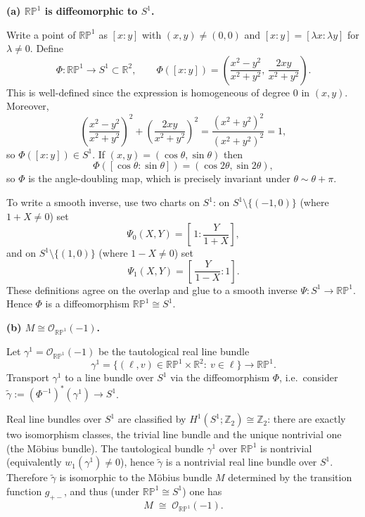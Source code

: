 \begin{solution}

\par\medskip\noindent\textbf{(a) $\mathbb{RP}^1$ is diffeomorphic to $S^1$.}\par\smallskip

Write a point of $\mathbb{RP}^1$ as $[x:y]$ with $(x,y)\neq (0,0)$ and $[x:y]=[\lambda x:\lambda y]$
for $\lambda\neq 0$.
Define
\[
\Phi:\mathbb{RP}^1 \longrightarrow S^1\subset\mathbb{R}^2,\qquad
\Phi([x:y])=\left(\frac{x^2-y^2}{x^2+y^2},\,\frac{2xy}{x^2+y^2}\right).
\]
This is well-defined since the expression is homogeneous of degree $0$ in $(x,y)$.
Moreover,
\[
\left(\frac{x^2-y^2}{x^2+y^2}\right)^2+\left(\frac{2xy}{x^2+y^2}\right)^2
=\frac{(x^2+y^2)^2}{(x^2+y^2)^2}=1,
\]
so $\Phi([x:y])\in S^1$. If $(x,y)=(\cos\theta,\sin\theta)$ then
\[
\Phi([\cos\theta:\sin\theta])=(\cos 2\theta,\sin 2\theta),
\]
so $\Phi$ is the angle-doubling map, which is precisely invariant under $\theta\sim\theta+\pi$.

To write a smooth inverse, use two charts on $S^1$:
on $S^1\setminus\{(-1,0)\}$ (where $1+X\neq 0$) set
\[
\Psi_0(X,Y)=\left[\,1:\frac{Y}{1+X}\right],
\]
and on $S^1\setminus\{(1,0)\}$ (where $1-X\neq 0$) set
\[
\Psi_1(X,Y)=\left[\,\frac{Y}{1-X}:1\right].
\]
These definitions agree on the overlap and glue to a smooth inverse $\Psi:S^1\to \mathbb{RP}^1$.
Hence $\Phi$ is a diffeomorphism $\mathbb{RP}^1\cong S^1$.

\par\medskip\noindent\textbf{(b) $M \cong \mathcal{O}_{\mathbb{RP}^1}(-1)$.}\par\smallskip

Let $\gamma^1=\mathcal{O}_{\mathbb{RP}^1}(-1)$ be the tautological real line bundle
\[
\gamma^1=\{(\ell,v)\in\mathbb{RP}^1\times\mathbb{R}^2:\ v\in \ell\}\longrightarrow \mathbb{RP}^1.
\]
Transport $\gamma^1$ to a line bundle over $S^1$ via the diffeomorphism $\Phi$, i.e.\ consider
$\widetilde{\gamma}:=(\Phi^{-1})^*(\gamma^1)\to S^1$.

Real line bundles over $S^1$ are classified by $H^1(S^1;\mathbb{Z}_2)\cong \mathbb{Z}_2$:
there are exactly two isomorphism classes, the trivial line bundle and the unique nontrivial one (the M\"{o}bius bundle).
The tautological bundle $\gamma^1$ over $\mathbb{RP}^1$ is nontrivial (equivalently $w_1(\gamma^1)\neq 0$),
hence $\widetilde{\gamma}$ is a nontrivial real line bundle over $S^1$.
Therefore $\widetilde{\gamma}$ is isomorphic to the M\"{o}bius bundle $M$ determined by the transition
function $g_{+-}$, and thus (under $\mathbb{RP}^1\cong S^1$) one has
\[
M \;\cong\; \mathcal{O}_{\mathbb{RP}^1}(-1).
\]




\end{solution}

